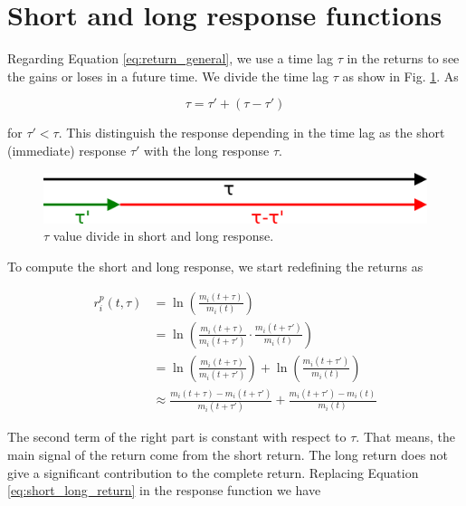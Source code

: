 \section{Short and long response functions}\label{sec:short_long}

Regarding Equation \ref{eq:return_general}, we use a time lag $\tau$ in the
returns to see the gains or loses in a future time. We divide the time lag
$\tau$ as show in Fig. \ref{fig:tau_short_long}. As

\begin{equation}\label{eq:tau_short_long}
    \tau = \tau' + \left( \tau - \tau' \right)
\end{equation}

for $\tau' < \tau$. This distinguish the response depending in the time lag as
the short (immediate) response $\tau'$ with the long response $\tau$.

\begin{figure}[htbp]
    \centering
    \includegraphics[width=\columnwidth]{figures/05_tau_short_long.png}
    \caption{$\tau$ value divide in short and long response.}
    \label{fig:tau_short_long}
\end{figure}

To compute the short and long response, we start redefining the returns as

\begin{align}\label{eq:short_long_return}
    r^{p}_{i}\left(t,\tau\right)&=\ln\left(\frac{m_{i}\left(t+\tau\right)}
    {m_{i} \left(t\right)}\right) \nonumber \\
    &=\ln\left(\frac{m_{i}\left(t+\tau\right)}{m_{i}\left(t+\tau'\right)}
    \cdot\frac{m_{i} \left(t+\tau'\right)}{m_{i}\left(t\right)}\right)
    \nonumber \\
    &=\ln\left(\frac{m_{i}\left(t+\tau\right)}{m_{i}\left(t+\tau'\right)}
    \right)+ \ln\left(\frac{m_{i}\left(t+\tau'\right)}{m_{i}\left(t\right)}
    \right)\nonumber \\
    &\approx\frac{m_{i}\left(t+\tau\right)-m_{i}\left(t+\tau'\right)}
    {m_{i}\left(t+\tau'\right)} +\frac{m_{i}\left(t+\tau'\right)-m_{i}
    \left(t\right)}{m_{i}\left(t\right)}
\end{align}

The second term of the right part is constant with respect to $\tau$. That
means, the main signal of the return come from the short return. The long
return does not give a significant contribution to the complete return.
Replacing Equation \ref{eq:short_long_return} in the response function we have

